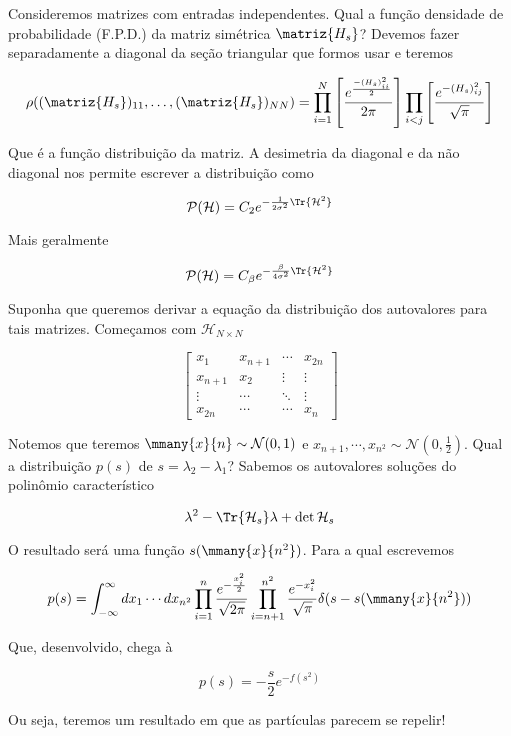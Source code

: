 Consideremos matrizes com entradas independentes. Qual a função densidade de probabilidade (F.P.D.) da matriz simétrica $\matriz{H_s}$? Devemos fazer separadamente a diagonal da seção triangular que formos usar e teremos

\[
\rho((\matriz{H_s})_{11}, \dots, (\matriz{H_s})_{NN}) = \prod_{i=1}^{N} \left[ \frac{e^{\frac{-(H_s)^2_{ii}}{2}}}{2\pi} \right] \prod_{i<j} \left[ \frac{e^{-(H_s)^2_{ij}}}{\sqrt{\pi}} \right]
\]

Que é a função distribuição da matriz. A desimetria da diagonal e da não diagonal nos permite escrever a distribuição como 

\begin{equation}
	\mathcal{P}(\mathcal{H}) = C_2 e^{-\frac{1}{2\sigma^2} \Tr{\mathcal{H}^2}}
\end{equation}

Mais geralmente

\begin{equation}
	\mathcal{P}(\mathcal{H}) = C_{\beta} e^{-\frac{\beta}{4\sigma^2} \Tr{\mathcal{H}^2}}
\end{equation}

Suponha que queremos derivar a equação da distribuição dos autovalores para tais matrizes. Começamos com $\mathcal{H}_{N\times N}$

\[
\begin{bmatrix}
	x_1 & x_{n+1} & \cdots & x_{2n} \\
	x_{n+1} & x_2 & \vdots & \vdots \\
	\vdots & \cdots & \ddots & \vdots \\
	x_{2n} & \cdots & \cdots & x_n
\end{bmatrix}
\]

Notemos que teremos $\mmany{x}{n} \sim \mathcal{N}(0,1)$ e $x_{n+1}, \cdots, x_{n^2} \sim \mathcal{N}(0,\frac{1}{2})$. Qual a distribuição $p(s)$ de $s = \lambda_2 - \lambda_1$? Sabemos os autovalores soluções do polinômio característico

\[
	\lambda^2 - \Tr{\mathcal{H}_s} \lambda + \det{\mathcal{H}_s}
\]

O resultado será uma função $s(\mmany{x}{{n^2}})$. Para a qual escrevemos

\[
p(s) = \int_{-\infty}^{\infty} dx_1 \cdots dx_{n^2} \prod_{i=1}^{n} \frac{e^{-\frac{x_i^2}{2}}}{\sqrt{2\pi}} \prod_{i=n+1}^{n^2} \frac{e^{-x_i^2}}{\sqrt{\pi}} \delta(s - s(\mmany{x}{{n^2}}))
\]

Que, desenvolvido, chega à

\[
	p(s) = -\frac{s}{2} e^{-f(s^2)}
\]

Ou seja, teremos um resultado em que as partículas parecem se repelir!